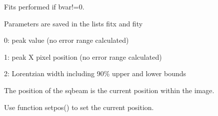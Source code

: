 \documentclass[letterpaper,10pt,english]{sphinxmanual}
\begin{document}
\begin{fulllineitems}
\begin{quote}
\begin{description}
\end{description}\end{quote}

\begin{DUlineblock}{0em}
\item[] 
\item[] Fits performed if bvar!=0.
\item[] Parameters are saved in the lists fitx and fity
\item[]
\begin{DUlineblock}{\DUlineblockindent}
\item[] 0: peak value (no error range calculated)
\item[] 1: peak X pixel position (no error range calculated)
\item[] 2: Lorentzian width including 90\% upper and lower bounds
\end{DUlineblock}
\item[] The position of the sqbeam is the current position within the image.
\item[] Use function setpos() to set the current position.
\end{DUlineblock}

\end{fulllineitems}

\end{document}
